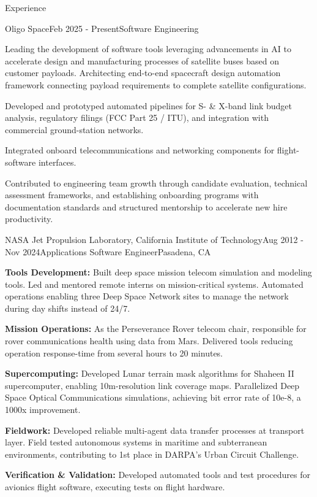 \documentclass{resume} %
\begin{document}
\begin{rSection}{Experience}
\begin{rSubsection}{Oligo Space}{Feb 2025 - Present}{Software Engineering}{}
\item Leading the development of software tools leveraging advancements in AI to accelerate design and manufacturing processes of satellite buses based on customer payloads. Architecting end-to-end spacecraft design automation framework connecting payload requirements to complete satellite configurations.
\item Developed and prototyped automated pipelines for S- \& X-band link budget analysis, regulatory filings (FCC Part 25 / ITU), and integration with commercial ground-station networks.
\item Integrated onboard telecommunications and networking components for flight-software interfaces.
\item Contributed to engineering team growth through candidate evaluation, technical assessment frameworks, and establishing onboarding programs with documentation standards and structured mentorship to accelerate new hire productivity.
\end{rSubsection}

\begin{rSubsection}{NASA Jet Propulsion Laboratory, California Institute of Technology}{Aug 2012 - Nov 2024}{Applications Software Engineer}{Pasadena, CA}
\item {\bf{Tools Development:}}
Built deep space mission telecom simulation and modeling tools. Led and mentored remote interns on mission-critical systems. Automated operations enabling three Deep Space Network sites to manage the network during day shifts instead of 24\slash 7.
\item {\bf{Mission Operations:}}
As the Perseverance Rover telecom chair, responsible for rover communications health using data from Mars. Delivered tools reducing operation response-time from several hours to 20 minutes.
\item {\bf{Supercomputing:}} 
Developed Lunar terrain mask algorithms for Shaheen II supercomputer, enabling 10m-resolution link coverage maps. Parallelized Deep Space Optical Communications simulations, achieving bit error rate of 10e-8, a 1000x improvement.
\item {\bf{Fieldwork:}} 
Developed reliable multi-agent data transfer processes at transport layer. Field tested autonomous systems in maritime and subterranean environments, contributing to 1st place in DARPA's Urban Circuit Challenge.
\item {\bf{Verification \& Validation:}} 
Developed automated tools and test procedures for avionics flight software, executing tests on flight hardware.
\end{rSubsection}

\end{rSection}
\end{document}
